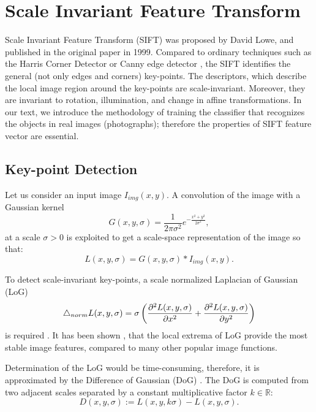 \section{Scale Invariant Feature Transform}
Scale Invariant Feature Transform (SIFT) was proposed by David Lowe, and published in the original paper \cite{Lowe1999} in 1999. Compared to ordinary techniques such as the Harris Corner Detector \cite{Harris1988} or Canny edge detector \cite{Canny1986}, the SIFT identifies the general (not only edges and corners) key-points. The descriptors, which describe the local image region around the key-points are scale-invariant. Moreover, they are invariant to rotation, illumination, and change in affine transformations. In our text, we introduce the methodology of training the classifier that recognizes the objects in real images (photographs); therefore the properties of SIFT feature vector are essential.

\subsection{Key-point Detection}

Let us consider an input image \( I_{img}(x,y) \). A convolution of the image with a Gaussian kernel
\begin{equation}
    G(x,y,\sigma) = \frac{1}{2\pi\sigma^2}e^{-\frac{x^2+y^2}{2\sigma^2}},
    \label{eq:Gaussian_kernel}
\end{equation}
at a scale \( \sigma > 0 \) is exploited to get a scale-space representation of the image so that:
\begin{equation}
    L(x, y,\sigma) =  G(x,y,\sigma)*I_{img}(x,y).
\end{equation}

To detect scale-invariant key-points, a scale normalized Laplacian of Gaussian (LoG)
\begin{equation}
    \mathop{}\!\mathbin\bigtriangleup_{norm} L(x, y, \sigma) = \sigma\left(\frac{\partial^2 L(x,y,\sigma)}{\partial x^2} + \frac{\partial^2 L(x,y,\sigma)}{\partial y^2}\right)
\end{equation}
is required \cite{Koenderink1984}. It has been shown \cite{Mikolajczyk2002}, that the local extrema of LoG provide the most stable image features, compared to many other popular image functions.

Determination of the LoG would be time-consuming, therefore, it is approximated by the Difference of Gaussian (DoG) \cite{Lowe2004}. The DoG is computed from two adjacent scales separated by a constant multiplicative factor $k \in \mathbb{R}$:
\begin{equation}
    D(x,y,\sigma) := L(x,y,k\sigma) - L(x,y,\sigma).
\end{equation}

